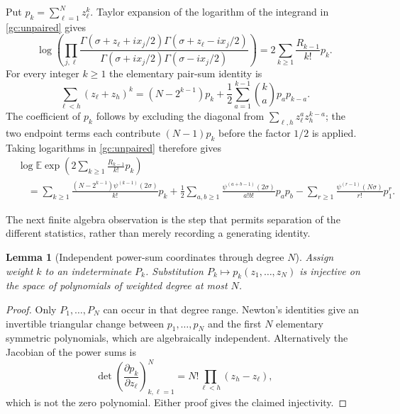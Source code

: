 \documentclass[11pt,a4paper]{article}
\numberwithin{equation}{section}
\newtheorem{lemma}[theorem]{Lemma}
\theoremstyle{definition}
\theoremstyle{remark}
\begin{document}
Put $p_k=\sum_{\ell=1}^N z_\ell^k$. Taylor expansion of the logarithm
of the integrand in \eqref{gc:unpaired} gives
\[
 \log\left(\prod_{j,\ell}\frac{\Gamma(\sigma+z_\ell+ix_j/2)
     \Gamma(\sigma+z_\ell-ix_j/2)}
     {\Gamma(\sigma+ix_j/2)\Gamma(\sigma-ix_j/2)}\right)
            =2\sum_{k\ge1}\frac{R_{k-1}}{k!}p_k.
\]
For every integer $k\ge1$ the elementary pair-sum identity is
\begin{equation}\label{gc:pairsum}
 \sum_{\ell<h}(z_\ell+z_h)^k
 =(N-2^{k-1})p_k+\frac12\sum_{a=1}^{k-1}
                              \binom ka p_a p_{k-a}.
\end{equation}
The coefficient of $p_k$ follows by excluding the diagonal from
$\sum_{\ell,h}z_\ell^a z_h^{k-a}$; the two endpoint terms each
contribute $(N-1)p_k$ before the factor $1/2$ is applied.
Taking logarithms in \eqref{gc:unpaired} therefore gives
\begin{equation}\label{gc:power-sum-log}
\begin{split}
 &\log\mathbb E\exp\left(2\sum_{k\ge1}\frac{R_{k-1}}{k!}p_k\right)\\
 &\quad=\sum_{k\ge1}
       \frac{(N-2^{k-1})\psi^{(k-1)}(2\sigma)}{k!}p_k
       +\frac12\sum_{a,b\ge1}
          \frac{\psi^{(a+b-1)}(2\sigma)}{a!b!}p_a p_b
       -\sum_{r\ge1}\frac{\psi^{(r-1)}(N\sigma)}{r!}p_1^r.
\end{split}
\end{equation}

The next finite algebra observation is the step that permits separation
of the different statistics, rather than merely recording a generating
identity.

\begin{lemma}[Independent power-sum coordinates through degree $N$]
\label{gc:psindependent}
Assign weight $k$ to an indeterminate $P_k$. Substitution
$P_k\mapsto p_k(z_1,\ldots,z_N)$ is injective on the space of
polynomials of weighted degree at most $N$.
\end{lemma}
\begin{proof}
Only $P_1,\ldots,P_N$ can occur in that degree range.
Newton's identities give an invertible triangular change between
$p_1,\ldots,p_N$ and the first $N$ elementary symmetric polynomials,
which are algebraically independent. Alternatively the Jacobian of
the power sums is
\[
 \det\left(\frac{\partial p_k}{\partial z_\ell}\right)_{k,\ell=1}^N
              =N!\prod_{\ell<h}(z_h-z_\ell),
\]
which is not the zero polynomial. Either proof gives the claimed
injectivity.
\end{proof}
\end{document}
